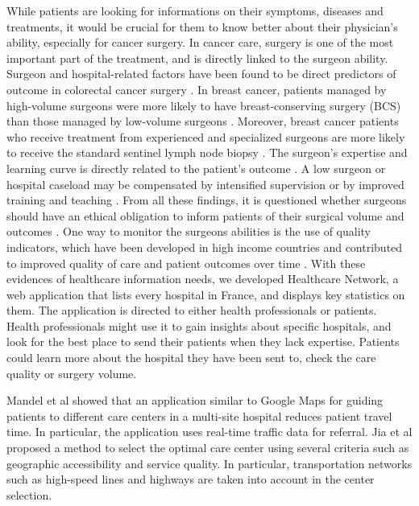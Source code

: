 While patients are looking for informations on their symptoms, diseases and
treatments, it would be crucial for them to know better about their physician's
ability, especially for cancer surgery. In cancer care, surgery is one of the
most important part of the treatment, and is directly linked to the surgeon
ability.
Surgeon and hospital-related factors have been found to be direct predictors of
outcome in colorectal cancer surgery \cite{renzulli_influence_2006,
    bonati_surgeon_2021}. In breast cancer, patients managed by high-volume surgeons
were more likely to have breast-conserving surgery (BCS) than those managed by
low-volume surgeons \cite{mcdermott_surgeon_2013}. Moreover, breast cancer
patients who receive treatment from experienced and specialized surgeons are
more likely to receive the standard sentinel lymph node biopsy
\cite{yen_surgeon_2014}. The surgeon's expertise and learning curve is directly
related to the patient's outcome \cite{renzulli_learning_2005}. A low surgeon or
hospital caseload may be compensated by intensified supervision or by improved
training and teaching \cite{bonati_surgeon_2021}. From all these findings, it is
questioned whether surgeons should have an ethical obligation to inform patients
of their surgical volume and outcomes \cite{glaser_surgeon_2019}. One way to
monitor the surgeons abilities is the use of quality indicators, which have been
developed in high income countries and contributed to improved quality of care
and patient outcomes over time \cite{nietz_quality_2020}.
With these evidences of healthcare information needs, we developed Healthcare
Network, a web application that lists every hospital in France, and displays key
statistics on them. The application is directed to either health professionals
or patients. Health professionals might use it to gain insights about specific
hospitals, and look for the best place to send their patients when they lack
expertise. Patients could learn more about the hospital they have been sent to,
check the care quality or surgery volume.

Mandel et al \cite{mandel_optimizing_2018} showed that an application similar to
Google Maps for guiding patients to different care centers in a multi-site
hospital reduces patient travel time. In particular, the application uses
real-time traffic data for referral. Jia et al \cite{jia_selecting_2014}
proposed a method to select the optimal care center using several criteria such
as geographic accessibility and service quality. In particular, transportation
networks such as high-speed lines and highways are taken into account in the
center selection.

